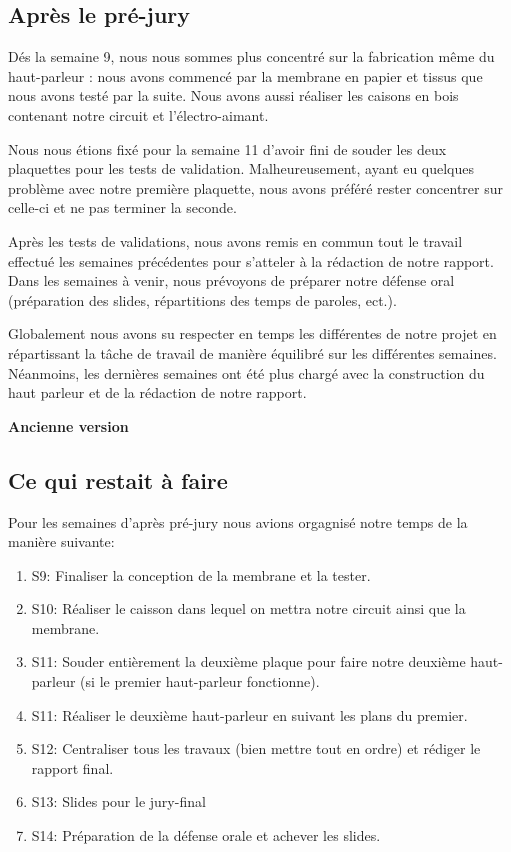 \subsection{Après le pré-jury}

Dés la semaine 9, nous nous sommes plus concentré sur la fabrication même du haut-parleur : nous avons commencé par la
membrane en papier et tissus que nous avons testé par la suite. Nous avons aussi réaliser les caisons en bois contenant notre
circuit et l'électro-aimant.

Nous nous étions fixé pour la semaine 11 d'avoir fini de souder les deux plaquettes pour les tests de validation. Malheureusement,
ayant eu quelques problème avec notre première plaquette, nous avons préféré rester concentrer sur celle-ci et ne pas terminer
la seconde. 

Après les tests de validations, nous avons remis en commun tout le travail effectué les semaines précédentes pour s'atteler
à la rédaction de notre rapport.
Dans les semaines à venir, nous prévoyons de préparer notre défense oral (préparation des slides, répartitions des temps 
de paroles, ect.).

Globalement nous avons su respecter en temps les différentes de notre projet en répartissant la tâche de travail de manière
équilibré sur les différentes semaines. Néanmoins, les dernières semaines ont été plus chargé avec la construction du haut parleur 
et de la rédaction de notre rapport.

\textbf{Ancienne version}

\subsection{Ce qui restait à faire}

Pour les semaines d'après pré-jury nous avions orgagnisé notre temps de la manière suivante:

\begin{enumerate}
	\item{S9}: Finaliser la conception de la membrane et la tester.
	\item{S10}: Réaliser le caisson dans lequel on mettra notre circuit ainsi que la membrane.
	\item{S11}: Souder entièrement la deuxième plaque pour faire notre deuxième haut-parleur (si le premier haut-parleur fonctionne).
	\item{S11}: Réaliser le deuxième haut-parleur en suivant les plans du premier.
	\item{S12}: Centraliser tous les travaux (bien mettre tout en ordre) et rédiger le rapport final.
	\item{S13}: Slides pour le jury-final
	\item{S14}: Préparation de la défense orale et achever les slides.
\end{enumerate}


